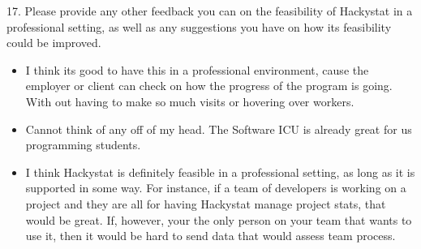 17. Please provide any other feedback you can on the feasibility of Hackystat in a professional setting, as well as any suggestions you have on how its feasibility could be improved.
\begin{itemize}
\item I think its good to have this in a professional environment, cause the employer or client  can check on how the progress of the program is going. With out having to make so much visits or hovering over workers.
\item Cannot think of any off of my head.  The Software ICU is already great for us programming students.  
\item I think Hackystat is definitely feasible in a professional setting, as long as it is supported in some way. For instance, if a team of developers is working on a project and they are all for having Hackystat manage project stats, that would be great. If, however, your the only person on your team that wants to use it, then it would be hard to send data that would assess team process.


\end{itemize}
